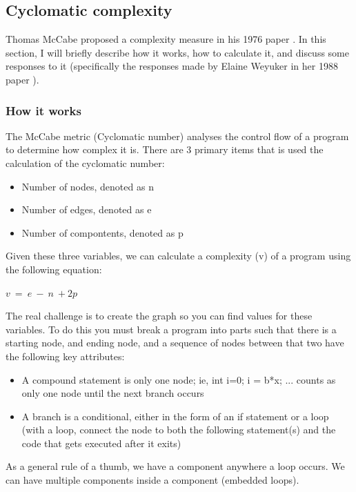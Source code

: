 \documentclass[]{article}
\begin{document}
\subsection{Cyclomatic complexity}

Thomas McCabe proposed a complexity measure in his 1976 paper \cite{ref:a_complexity_measure}.
In this section, I will briefly describe how it works, how to calculate it, and discuss some responses to it (specifically the responses made by  Elaine Weyuker in her 1988 paper \cite{ref:evaluating_software_complexity_measures}).

\subsubsection{How it works}

The McCabe metric (Cyclomatic number) analyses the control flow of a program to determine how complex it is. 
There are 3 primary items that is used the calculation of the cyclomatic number:
\begin{itemize}
	\item Number of nodes, denoted as n
	\item Number of edges, denoted as e
	\item Number of compontents, denoted as p
\end{itemize}

Given these three variables, we can calculate a complexity (v) of a program using the following equation:

$v ~= ~e ~- ~n ~+ 2p$

The real challenge is to create the graph so you can find values for these variables.
To do this you must break a program into parts such that there is a starting node, and ending node, and a sequence of nodes between that two have the following key attributes:
\begin{itemize}
	\item A compound statement is only one node; ie, int i=0; i = b*x; ... counts as only one node until the next branch occurs
	\item A branch is a conditional, either in the form of an if statement or a loop (with a loop, connect the node to both the following statement(s) and the code that gets executed after it exits)
\end{itemize}

As a general rule of a thumb, we have a component anywhere a loop occurs.
We can have multiple components inside a component (embedded loops). 
\end{document}
